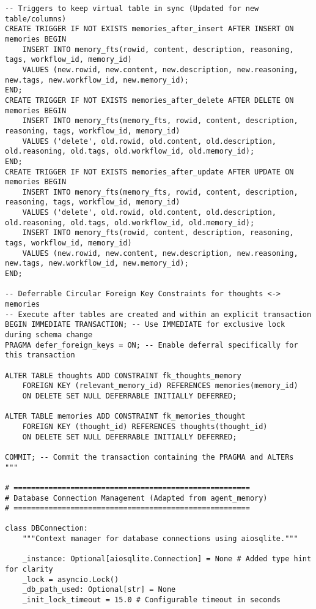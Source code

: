 \documentclass[12pt,a4paper]{article}
\begin{document}
\begin{pageablecode}
\begin{verbatim}
-- Triggers to keep virtual table in sync (Updated for new table/columns)
CREATE TRIGGER IF NOT EXISTS memories_after_insert AFTER INSERT ON memories BEGIN
    INSERT INTO memory_fts(rowid, content, description, reasoning, tags, workflow_id, memory_id)
    VALUES (new.rowid, new.content, new.description, new.reasoning, new.tags, new.workflow_id, new.memory_id);
END;
CREATE TRIGGER IF NOT EXISTS memories_after_delete AFTER DELETE ON memories BEGIN
    INSERT INTO memory_fts(memory_fts, rowid, content, description, reasoning, tags, workflow_id, memory_id)
    VALUES ('delete', old.rowid, old.content, old.description, old.reasoning, old.tags, old.workflow_id, old.memory_id);
END;
CREATE TRIGGER IF NOT EXISTS memories_after_update AFTER UPDATE ON memories BEGIN
    INSERT INTO memory_fts(memory_fts, rowid, content, description, reasoning, tags, workflow_id, memory_id)
    VALUES ('delete', old.rowid, old.content, old.description, old.reasoning, old.tags, old.workflow_id, old.memory_id);
    INSERT INTO memory_fts(rowid, content, description, reasoning, tags, workflow_id, memory_id)
    VALUES (new.rowid, new.content, new.description, new.reasoning, new.tags, new.workflow_id, new.memory_id);
END;

-- Deferrable Circular Foreign Key Constraints for thoughts <-> memories
-- Execute after tables are created and within an explicit transaction
BEGIN IMMEDIATE TRANSACTION; -- Use IMMEDIATE for exclusive lock during schema change
PRAGMA defer_foreign_keys = ON; -- Enable deferral specifically for this transaction

ALTER TABLE thoughts ADD CONSTRAINT fk_thoughts_memory
    FOREIGN KEY (relevant_memory_id) REFERENCES memories(memory_id)
    ON DELETE SET NULL DEFERRABLE INITIALLY DEFERRED;

ALTER TABLE memories ADD CONSTRAINT fk_memories_thought
    FOREIGN KEY (thought_id) REFERENCES thoughts(thought_id)
    ON DELETE SET NULL DEFERRABLE INITIALLY DEFERRED;

COMMIT; -- Commit the transaction containing the PRAGMA and ALTERs
"""

# ======================================================
# Database Connection Management (Adapted from agent_memory)
# ======================================================

class DBConnection:
    """Context manager for database connections using aiosqlite."""

    _instance: Optional[aiosqlite.Connection] = None # Added type hint for clarity
    _lock = asyncio.Lock()
    _db_path_used: Optional[str] = None
    _init_lock_timeout = 15.0 # Configurable timeout in seconds


\end{verbatim}
\end{pageablecode}
\end{document}
